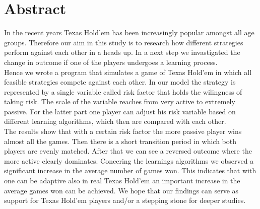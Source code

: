 \documentclass[11pt]{article}
\begin{document}



\tableofcontents

\newpage




\section{Abstract}





In the recent years Texas Hold'em has been increasingly popular amongst all age groups. Therefore our aim in this study is to research how different strategies perform against each other in a heads up. In a next step we invastigated the change in outcome if one of the players undergoes a learning process. \\
Hence we wrote a program that simulates a game of Texas Hold'em in which all feasible strategies compete against each other. In our model the strategy is represented by a single variable called risk factor that holds the wilingness of taking risk. The scale of the variable reaches from very active to extremely passive. For the latter part one player can adjust his risk variable based on different learning algorithms, which then are compared with each other.\\
The results show that with a certain risk factor the more passive player wins almost all the games. Then there is a short transition period in which both players are evenly matched. After that we can see a reversed outcome where the more active clearly dominates. Concering the learnings algorithms we observed a significant increase in the average number of games won. This indicates that with one can be adaptive also in real Texas Hold'em an important increase in the average games won can be achieved. We hope that our findings can serve as support for Texas Hold'em players and/or a stepping stone for deeper studies.
\end{document}
